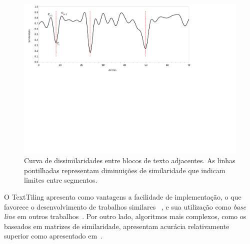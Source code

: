    
\begin{figure}[h!]
\center
	\includegraphics[trim={ 10 320 180 0 },clip,page=1,width=\textwidth]{conteudo/capitulos/figs/curva-similaridade-2.pdf}

	\caption{Curva de dissimilaridades entre blocos de texto adjacentes. As linhas pontilhadas representam diminuições de similaridade que indicam limites entre segmentos.}
	\label{fig:curvasimilaridade}
\end{figure}



O TextTiling apresenta como vantagens a facilidade de implementação, 
o que favorece o desenvolvimento de trabalhos similares 
~\cite{Naili2016,bokaei2015a,CHAIBI2014,Kern2009,Galley2003}, 
e sua utilização como \textit{base line} em outros trabalhos~\cite{Cardoso2017,Dias2007}. Por outro lado, algoritmos mais complexos, como os baseados em matrizes de similaridade, apresentam acurácia relativamente superior como apresentado em~\cite{Choic99, Kern2009, misra2009a}.





